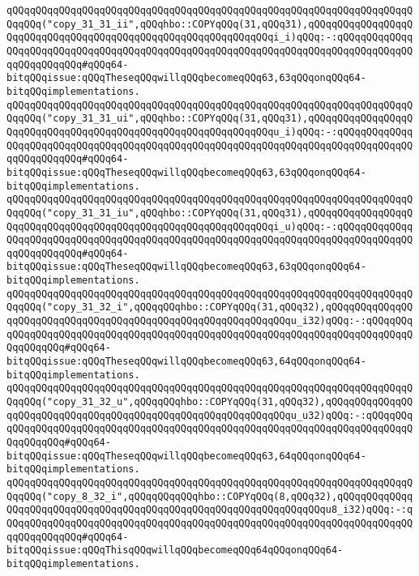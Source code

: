 \newline
\verb|qQQqqQQqqQQqqQQqqQQqqQQqqQQqqQQqqQQqqQQqqQQqqQQqqQQqqQQqqQQqqQQqqQQqqQQqqQQq("copy_31_31_ii",qQQqhbo::COPYqQQq(31,qQQq31),qQQqqQQqqQQqqQQqqQQqqQQqqQQqqQQqqQQqqQQqqQQqqQQqqQQqqQQqqQQqqQQqi_i)qQQq:-:qQQqqQQqqQQqqQQqqQQqqQQqqQQqqQQqqQQqqQQqqQQqqQQqqQQqqQQqqQQqqQQqqQQqqQQqqQQqqQQqqQQqqQQqqQQqqQQq#qQQq64-bitqQQqissue:qQQqTheseqQQqwillqQQqbecomeqQQq63,63qQQqonqQQq64-bitqQQqimplementations.|\newline
\verb|qQQqqQQqqQQqqQQqqQQqqQQqqQQqqQQqqQQqqQQqqQQqqQQqqQQqqQQqqQQqqQQqqQQqqQQqqQQq("copy_31_31_ui",qQQqhbo::COPYqQQq(31,qQQq31),qQQqqQQqqQQqqQQqqQQqqQQqqQQqqQQqqQQqqQQqqQQqqQQqqQQqqQQqqQQqqQQqu_i)qQQq:-:qQQqqQQqqQQqqQQqqQQqqQQqqQQqqQQqqQQqqQQqqQQqqQQqqQQqqQQqqQQqqQQqqQQqqQQqqQQqqQQqqQQqqQQqqQQqqQQq#qQQq64-bitqQQqissue:qQQqTheseqQQqwillqQQqbecomeqQQq63,63qQQqonqQQq64-bitqQQqimplementations.|\newline
\verb|qQQqqQQqqQQqqQQqqQQqqQQqqQQqqQQqqQQqqQQqqQQqqQQqqQQqqQQqqQQqqQQqqQQqqQQqqQQq("copy_31_31_iu",qQQqhbo::COPYqQQq(31,qQQq31),qQQqqQQqqQQqqQQqqQQqqQQqqQQqqQQqqQQqqQQqqQQqqQQqqQQqqQQqqQQqqQQqi_u)qQQq:-:qQQqqQQqqQQqqQQqqQQqqQQqqQQqqQQqqQQqqQQqqQQqqQQqqQQqqQQqqQQqqQQqqQQqqQQqqQQqqQQqqQQqqQQqqQQqqQQq#qQQq64-bitqQQqissue:qQQqTheseqQQqwillqQQqbecomeqQQq63,63qQQqonqQQq64-bitqQQqimplementations.|\newline
\newline
\verb|qQQqqQQqqQQqqQQqqQQqqQQqqQQqqQQqqQQqqQQqqQQqqQQqqQQqqQQqqQQqqQQqqQQqqQQqqQQq("copy_31_32_i",qQQqqQQqhbo::COPYqQQq(31,qQQq32),qQQqqQQqqQQqqQQqqQQqqQQqqQQqqQQqqQQqqQQqqQQqqQQqqQQqqQQqqQQqqQQqu_i32)qQQq:-:qQQqqQQqqQQqqQQqqQQqqQQqqQQqqQQqqQQqqQQqqQQqqQQqqQQqqQQqqQQqqQQqqQQqqQQqqQQqqQQqqQQqqQQq#qQQq64-bitqQQqissue:qQQqTheseqQQqwillqQQqbecomeqQQq63,64qQQqonqQQq64-bitqQQqimplementations.|\newline
\verb|qQQqqQQqqQQqqQQqqQQqqQQqqQQqqQQqqQQqqQQqqQQqqQQqqQQqqQQqqQQqqQQqqQQqqQQqqQQq("copy_31_32_u",qQQqqQQqhbo::COPYqQQq(31,qQQq32),qQQqqQQqqQQqqQQqqQQqqQQqqQQqqQQqqQQqqQQqqQQqqQQqqQQqqQQqqQQqqQQqu_u32)qQQq:-:qQQqqQQqqQQqqQQqqQQqqQQqqQQqqQQqqQQqqQQqqQQqqQQqqQQqqQQqqQQqqQQqqQQqqQQqqQQqqQQqqQQqqQQq#qQQq64-bitqQQqissue:qQQqTheseqQQqwillqQQqbecomeqQQq63,64qQQqonqQQq64-bitqQQqimplementations.|\newline
\newline
\verb|qQQqqQQqqQQqqQQqqQQqqQQqqQQqqQQqqQQqqQQqqQQqqQQqqQQqqQQqqQQqqQQqqQQqqQQqqQQq("copy_8_32_i",qQQqqQQqqQQqhbo::COPYqQQq(8,qQQq32),qQQqqQQqqQQqqQQqqQQqqQQqqQQqqQQqqQQqqQQqqQQqqQQqqQQqqQQqqQQqqQQqqQQqu8_i32)qQQq:-:qQQqqQQqqQQqqQQqqQQqqQQqqQQqqQQqqQQqqQQqqQQqqQQqqQQqqQQqqQQqqQQqqQQqqQQqqQQqqQQqqQQq#qQQq64-bitqQQqissue:qQQqThisqQQqwillqQQqbecomeqQQq64qQQqonqQQq64-bitqQQqimplementations.|\newline
